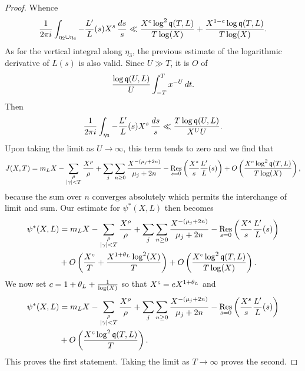 \begin{proof}
      Whence
      \[
        \frac{1}{2\pi i}\int_{\eta_{2} \cup \eta_{4}}-\frac{L'}{L}(s)X^{s}\,\frac{ds}{s} \ll \frac{X^{c}\log^{2}\mathfrak{q}(T,L)}{T\log(X)}+\frac{X^{1-c}\log\mathfrak{q}(T,L)}{T\log(X)}.
      \]
      As for the vertical integral along \(\eta_{3}\), the previous estimate of the logarithmic derivative of \(L(s)\) is also valid. Since \(U \gg T\), it is \(O\) of
      \[
        \frac{\log\mathfrak{q}(U,L)}{U}\int_{-T}^{T}x^{-U}\,dt.
      \]
      Then
      \[
        \frac{1}{2\pi i}\int_{\eta_{3}}-\frac{L'}{L}(s)X^{s}\,\frac{ds}{s} \ll \frac{T\log\mathfrak{q}(U,L)}{X^{U}U}.
      \]
      Upon taking the limit as \(U \to \infty\), this term tends to zero and we find that
      \[
        J(X,T) = m_{L}X-\sum_{\substack{\rho \\ |\gamma| < T}}\frac{X^{\rho}}{\rho}+\sum_{j}\sum_{n \ge 0}\frac{X^{-(\mu_{j}+2n)}}{\mu_{j}+2n}-\operatorname*{\mathrm{Res}}_{s = 0}\left(\frac{X^{s}}{s}\frac{L'}{L}(s)\right)+O\left(\frac{X^{c}\log^{2}\mathfrak{q}(T,L)}{T\log(X)}\right),
      \]
      because the sum over \(n\) converges absolutely which permits the interchange of limit and sum. Our estimate for \(\psi^{\ast}(X,L)\) then becomes
      \begin{align*}
        \psi^{\ast}(X,L) &= m_{L}X-\sum_{\substack{\rho \\ |\gamma| < T}}\frac{X^{\rho}}{\rho}+\sum_{j}\sum_{n \ge 0}\frac{X^{-(\mu_{j}+2n)}}{\mu_{j}+2n}-\operatorname*{\mathrm{Res}}_{s = 0}\left(\frac{X^{s}}{s}\frac{L'}{L}(s)\right) \\
        &+ O\left(\frac{X^{c}}{T}+\frac{X^{1+\theta_{L}}\log^{2}(X)}{T}\right)+O\left(\frac{X^{c}\log^{2}\mathfrak{q}(T,L)}{T\log(X)}\right).
      \end{align*}
      We now set \(c = 1+\theta_{L}+\frac{1}{\log(X)}\) so that \(X^{c} = eX^{1+\theta_{L}}\) and
      \begin{align*}
        \psi^{\ast}(X,L) &= m_{L}X-\sum_{\substack{\rho \\ |\gamma| < T}}\frac{X^{\rho}}{\rho}+\sum_{j}\sum_{n \ge 0}\frac{X^{-(\mu_{j}+2n)}}{\mu_{j}+2n}-\operatorname*{\mathrm{Res}}_{s = 0}\left(\frac{X^{s}}{s}\frac{L'}{L}(s)\right) \\
        &+ O\left(\frac{X^{c}\log^{2}\mathfrak{q}(T,L)}{T}\right).
      \end{align*}
      This proves the first statement. Taking the limit as \(T \to \infty\) proves the second.
    \end{proof}